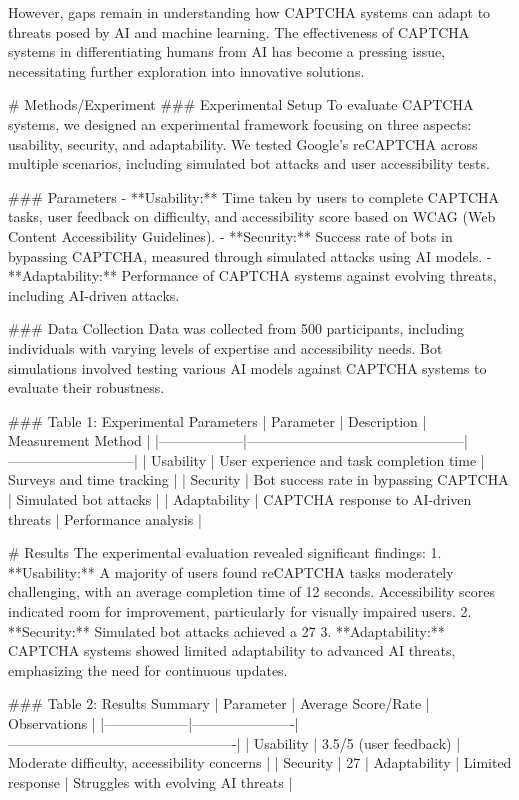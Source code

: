 However, gaps remain in understanding how CAPTCHA systems can adapt to threats posed by AI and machine learning. The effectiveness of CAPTCHA systems in differentiating humans from AI has become a pressing issue, necessitating further exploration into innovative solutions.

# Methods/Experiment  
### Experimental Setup  
To evaluate CAPTCHA systems, we designed an experimental framework focusing on three aspects: usability, security, and adaptability. We tested Google's reCAPTCHA across multiple scenarios, including simulated bot attacks and user accessibility tests.

### Parameters  
- **Usability:** Time taken by users to complete CAPTCHA tasks, user feedback on difficulty, and accessibility score based on WCAG (Web Content Accessibility Guidelines).  
- **Security:** Success rate of bots in bypassing CAPTCHA, measured through simulated attacks using AI models.  
- **Adaptability:** Performance of CAPTCHA systems against evolving threats, including AI-driven attacks.

### Data Collection  
Data was collected from 500 participants, including individuals with varying levels of expertise and accessibility needs. Bot simulations involved testing various AI models against CAPTCHA systems to evaluate their robustness.

### Table 1: Experimental Parameters  
| Parameter        | Description                                   | Measurement Method        |  
|------------------|-----------------------------------------------|---------------------------|  
| Usability        | User experience and task completion time      | Surveys and time tracking |  
| Security         | Bot success rate in bypassing CAPTCHA         | Simulated bot attacks     |  
| Adaptability     | CAPTCHA response to AI-driven threats         | Performance analysis      |  

# Results  
The experimental evaluation revealed significant findings:  
1. **Usability:** A majority of users found reCAPTCHA tasks moderately challenging, with an average completion time of 12 seconds. Accessibility scores indicated room for improvement, particularly for visually impaired users.  
2. **Security:** Simulated bot attacks achieved a 27%
3. **Adaptability:** CAPTCHA systems showed limited adaptability to advanced AI threats, emphasizing the need for continuous updates.

### Table 2: Results Summary  
| Parameter        | Average Score/Rate   | Observations                                     |  
|------------------|----------------------|-------------------------------------------------|  
| Usability        | 3.5/5 (user feedback) | Moderate difficulty, accessibility concerns     |  
| Security         | 27%
| Adaptability     | Limited response      | Struggles with evolving AI threats              |  

